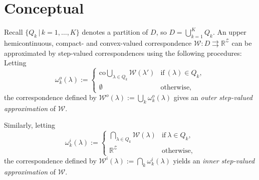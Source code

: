 \documentclass[a4paper,10pt,english]{sphinxmanual}
\begin{document}
\section{Conceptual}
\label{payoff_concept:conceptual}
Recall $\{Q_k\,|\,k=1,\ldots ,K\}$ denotes a partition of $D$, so
$D=\bigcup_{k=1}^K Q_k$. An upper hemicontinuous, compact- and
convex-valued correspondence $\mathcal{W}:D \rightrightarrows
\mathbb{R}^\mathcal{Z}$ can be approximated by step-valued correspondences using the following procedures: Letting
   \begin{equation*}
        \omega^o_k (\lambda) :=
        \begin{cases}
        \text{co}\bigcup_{\lambda \in Q_k}\mathcal{W}(\lambda') & \text{if} \ (\lambda) \in Q_k,\\
        \emptyset & \text{otherwise},
        \end{cases}
    \end{equation*}
the correspondence defined by $\mathcal{W}^o(\lambda) :=
\bigcup_{k}\omega^o_k (\lambda)$ gives an \emph{outer step-valued approximation}
of $\mathcal{W}$.

Similarly, letting
    \begin{equation*}
        \omega^i_k (\lambda) :=
        \begin{cases}
         \bigcap_{\lambda \in Q_k}\mathcal{W}(\lambda) & \text{if} \ \lambda \in Q_k,
         \\
        \mathbb{R}^\mathcal{Z} & \text{otherwise},
        \end{cases}
    \end{equation*}
the correspondence defined by $\mathcal{W}^i(\lambda) :=
\bigcap_{k}\omega^i_k (\lambda)$ yields an \emph{inner step-valued approximation}
of $\mathcal{W}$.
\end{document}
